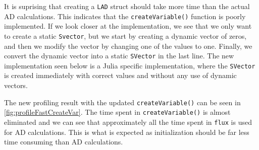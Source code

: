 It is suprising that creating a \texttt{LAD} struct should take more time than the actual AD calculations. This indicates that the \texttt{createVariable()} function is poorly implemented. If we look closer at the implementation, we see that we only want to create a static \texttt{Svector}, but we start by creating a dynamic vector of zeros, and then we modify the vector by changing one of the values to one. Finally, we convert the dynamic vector into a static \texttt{SVector} in the last line. The new implementation seen below is a Julia specific implementation, where the \texttt{SVector} is created immediately with correct values and without any use of dynamic vectors.

The new profiling result with the updated \texttt{createVariable()} can be seen in \autoref{fig:profileFastCreateVar}. The time spent in \texttt{createVariable()} is almost eliminated and we can see that approximately all the time spent in \texttt{flux} is used for AD calculations. This is what is expected as initialization should be far less time consuming than AD calculations. 

